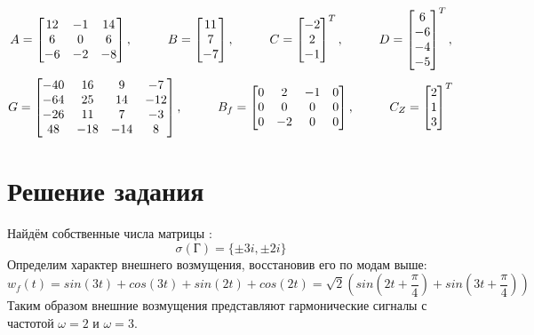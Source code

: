 $$
  A = \begin{bmatrix}
    12 & -1 & 14 \\
    6 & 0 & 6 \\
    -6 & -2 & -8 \\
\end{bmatrix}, \hspace*{1cm} B = \begin{bmatrix}
  11 \\
  7 \\
  -7 \\
\end{bmatrix}, \hspace*{1cm} C = \begin{bmatrix}
  -2 \\ 2 \\ -1 \\
\end{bmatrix}^T, \hspace*{1cm} D = \begin{bmatrix}
  6 \\
  -6 \\
  -4 \\
  -5 \\
\end{bmatrix}^T, 
$$
$$
G = \begin{bmatrix}
  -40 & 16 & 9 & -7 \\
  -64 & 25 & 14 & -12 \\
  -26 & 11 & 7 & -3 \\
  48 & -18 & -14 & 8 \\
\end{bmatrix}, \hspace*{1cm} B_f =\begin{bmatrix}
       0 & 2 & -1 & 0 \\
       0 & 0 & 0 & 0 \\
       0 & -2 & 0 & 0 \\
   \end{bmatrix}, \hspace*{1cm}
  C_Z = \begin{bmatrix}
    2 \\ 1 \\ 3 \\
\end{bmatrix}^T
$$


\section{Решение задания}

Найдём собственные числа матрицы :
$$
  \sigma(\text{Г}) = \{ \pm 3i, \pm 2i \}
$$
Определим характер внешнего возмущения, восстановив его по модам выше:
$$
  w_f(t) = sin(3t) + cos(3t) + sin(2t) + cos(2t) = \sqrt{2}( sin(2t  + \frac{\pi}{4}) + sin(3t + \frac{ \pi}{4}) )
$$
Таким образом внешние возмущения представляют гармонические сигналы с частотой $\omega = 2$ и $\omega = 3$.

